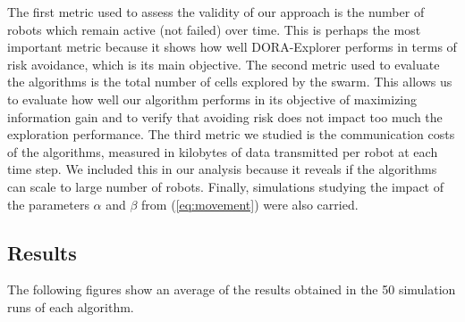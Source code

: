 \documentclass[letterpaper, 10 pt, conference]{ieeeconf}
\begin{document}
The first metric used to assess the validity of our approach is the
number of robots which remain active (not failed) over time. This is
perhaps the most important metric because it shows how well DORA-Explorer
performs in terms of risk avoidance, which is its main objective. The
second metric used to evaluate the algorithms is the total number of
cells explored by the swarm. This allows us to evaluate how well our
algorithm performs in its objective of maximizing information gain and
to verify that avoiding risk does not impact too much the exploration
performance. The third metric we studied is the communication costs of
the algorithms, measured in kilobytes of data transmitted per robot at
each time step. We included this in our analysis because it reveals if
the algorithms can scale to large number of robots. Finally, simulations studying the impact of the parameters $\alpha$ and $\beta$ from (\ref{eq:movement}) were also carried. 

\subsection{Results}
The following figures show an average of the results obtained in the
50 simulation runs of each algorithm.
\end{document}

